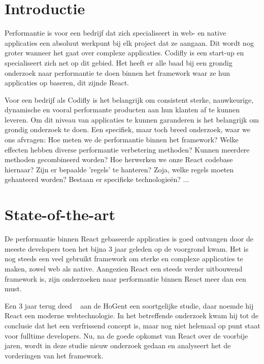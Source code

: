 
\section{Introductie} %
\label{sec:introductie}

Performantie is voor een bedrijf dat zich specialiseert in web- en native applicaties een absoluut werkpunt bij elk project dat ze aangaan. Dit wordt nog groter wanneer het gaat over complexe applicaties. Codifly is een start-up en specialiseert zich net op dit gebied. Het heeft er alle baad bij een grondig onderzoek naar performantie te doen binnen het framework waar ze hun applicaties op baseren, dit zijnde React.

Voor een bedrijf als Codifly is het belangrijk om consistent sterke, nauwkeurige, dynamische en vooral performante producten aan hun klanten af te kunnen leveren. Om dit niveau van applicaties te kunnen garanderen is het belangrijk om grondig onderzoek te doen.
Een specifiek, maar toch breed onderzoek, waar we ons afvragen: Hoe meten we de performantie binnen het framework? Welke effecten hebben diverse performantie verbetering methoden? Kunnen meerdere methoden gecombineerd worden? Hoe herwerken we onze React codebase hiernaar? Zijn er bepaalde 'regels' te hanteren? Zoja, welke regels moeten gehanteerd worden? Bestaan er specifieke technologieën? ...


\section{State-of-the-art}
\label{sec:state-of-the-art}

De performantie binnen React gebaseerde applicaties is goed ontvangen door de meeste developers toen het bijna 3 jaar geleden op de voorgrond kwam. Het is nog steeds een veel gebruikt framework om sterke en complexe applicaties te maken, zowel web als native. Aangezien React een steeds verder uitbouwend framework is, zijn onderzoeken naar performantie binnen React meer dan een must. 

Een 3 jaar terug deed ~\textcite{DeCock2016} aan de HoGent een soortgelijke studie, daar noemde hij React een moderne webtechnologie. In het betreffende onderzoek kwam hij tot de conclusie dat het een verfrissend concept is, maar nog niet helemaal op punt staat voor fulltime developers. Nu, na de goede opkomst van React over de voorbije jaren, wordt in deze studie nieuw onderzoek gedaan en analyseert het de vorderingen van het framework.


